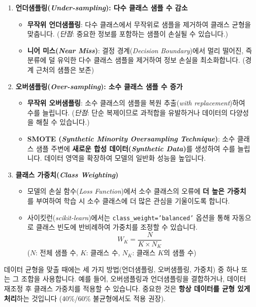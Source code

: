 \documentclass[11pt,a4paper]{book}
\theoremstyle{definition}
\begin{document}
\begin{enumerate}
    \item \textbf{언더샘플링(\emph{Under-sampling}): 다수 클래스 샘플 수 감소}
    \begin{itemize}
        \item \textbf{무작위 언더샘플링}: 다수 클래스에서 무작위로 샘플을 제거하여 클래스 균형을 맞춥니다. (\emph{단점}: 중요한 정보를 포함하는 샘플이 손실될 수 있습니다.)
        \item \textbf{니어 미스(\emph{Near Miss})}: 결정 경계(\emph{Decision Boundary})에서 멀리 떨어진, 즉 분류에 덜 유익한 다수 클래스 샘플을 제거하여 정보 손실을 최소화합니다. (경계 근처의 샘플은 보존)
    \end{itemize}

    \item \textbf{오버샘플링(\emph{Over-sampling}): 소수 클래스 샘플 수 증가}
    \begin{itemize}
        \item \textbf{무작위 오버샘플링}: 소수 클래스의 샘플을 복원 추출(\emph{with replacement})하여 수를 늘립니다. (\emph{단점}: 단순 복제이므로 과적합을 유발하거나 데이터의 다양성을 해칠 수 있습니다.)
        \item \textbf{SMOTE (\emph{Synthetic Minority Oversampling Technique})}: 소수 클래스 샘플 주변에 \textbf{새로운 합성 데이터(\emph{Synthetic Data})}를 생성하여 수를 늘립니다. 데이터 영역을 확장하여 모델의 일반화 성능을 높입니다.
    \end{itemize}

    \item \textbf{클래스 가중치(\emph{Class Weighting})}
    \begin{itemize}
        \item 모델의 손실 함수(\emph{Loss Function})에서 소수 클래스의 오류에 \textbf{더 높은 가중치}를 부여하여 학습 시 소수 클래스에 더 많은 관심을 기울이도록 합니다.
        \item 사이킷런(\emph{scikit-learn})에서는 \texttt{class\_weight='balanced'} 옵션을 통해 자동으로 클래스 빈도에 반비례하여 가중치를 조정할 수 있습니다.
        $$W_{K}=\frac{N}{K \times N_{K}}$$
        ($N$: 전체 샘플 수, $K$: 클래스 수, $N_K$: 클래스 $K$의 샘플 수)
    \end{itemize}
\end{enumerate}

\begin{tcolorbox}[examplebox, title={실제 사용 전략}]
데이터 균형을 맞출 때에는 세 가지 방법(언더샘플링, 오버샘플링, 가중치) 중 하나 또는 그 조합을 사용합니다. 예를 들어, 오버샘플링과 언더샘플링을 결합하거나, 데이터 재조정 후 클래스 가중치를 적용할 수 있습니다. 중요한 것은 \textbf{항상 데이터를 균형 있게 처리}하는 것입니다 (40\%/60\% 불균형에서도 적용 권장).
\end{tcolorbox}
\end{document}
